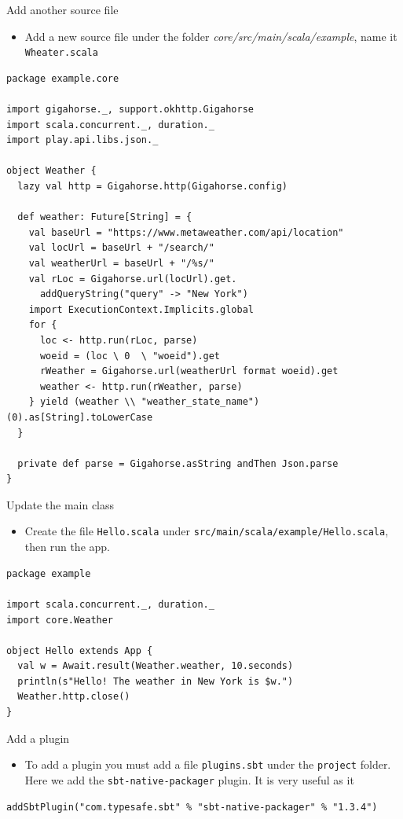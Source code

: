 \documentclass[presentation, aspectratio=169]{beamer}
\begin{document}
\begin{frame}[label={sec:org3d7a9fe},fragile]{Add another source file}
 \begin{itemize}
\item Add a new source file under the folder \emph{core/src/main/scala/example}, name it \texttt{Wheater.scala}
\end{itemize}
\tiny
\begin{verbatim}
package example.core

import gigahorse._, support.okhttp.Gigahorse
import scala.concurrent._, duration._
import play.api.libs.json._

object Weather {
  lazy val http = Gigahorse.http(Gigahorse.config)

  def weather: Future[String] = {
    val baseUrl = "https://www.metaweather.com/api/location"
    val locUrl = baseUrl + "/search/"
    val weatherUrl = baseUrl + "/%s/"
    val rLoc = Gigahorse.url(locUrl).get.
      addQueryString("query" -> "New York")
    import ExecutionContext.Implicits.global
    for {
      loc <- http.run(rLoc, parse)
      woeid = (loc \ 0  \ "woeid").get
      rWeather = Gigahorse.url(weatherUrl format woeid).get
      weather <- http.run(rWeather, parse)
    } yield (weather \\ "weather_state_name")(0).as[String].toLowerCase
  }

  private def parse = Gigahorse.asString andThen Json.parse
}
\end{verbatim}
\end{frame}

\begin{frame}[label={sec:orgb9f5ceb},fragile]{Update the main class}
 \begin{itemize}
\item Create the file \texttt{Hello.scala} under \texttt{src/main/scala/example/Hello.scala}, then run the app.
\end{itemize}
\tiny
\begin{verbatim}
package example

import scala.concurrent._, duration._
import core.Weather

object Hello extends App {
  val w = Await.result(Weather.weather, 10.seconds)
  println(s"Hello! The weather in New York is $w.")
  Weather.http.close()
}
\end{verbatim}
\end{frame}

\begin{frame}[label={sec:org617d990},fragile]{Add a plugin}
 \begin{itemize}
\item To add a plugin you must add a file \texttt{plugins.sbt} under the \texttt{project} folder.
Here we add the \texttt{sbt-native-packager} plugin. It is very useful as it
\end{itemize}
\begin{verbatim}
addSbtPlugin("com.typesafe.sbt" % "sbt-native-packager" % "1.3.4")
\end{verbatim}
\end{frame}
\end{document}
